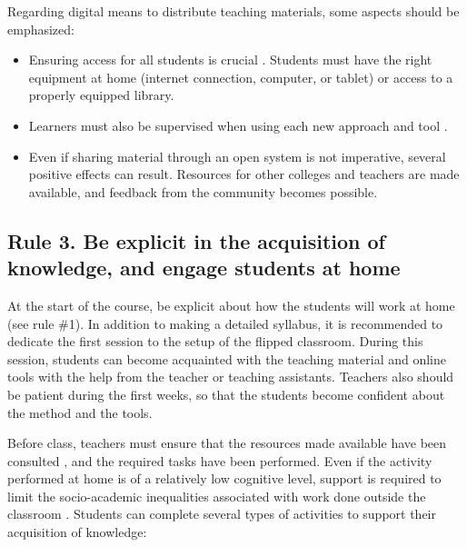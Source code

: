 \documentclass[10pt,letterpaper]{article}
\begin{document}
Regarding digital means to distribute teaching materials, some aspects should be emphasized:

\begin{itemize}

\item Ensuring access for all students is crucial \cite{lo_critical_2017}. 
Students must have the right equipment at home (internet connection, computer, or tablet) 
or access to a properly equipped library.

\item Learners must also be supervised when using each new approach and tool \cite{lo_critical_2017}.

\item Even if sharing material through an open system is not imperative, several positive effects can result. 
Resources for other colleges and teachers are made available, and feedback from the community becomes possible.

\end{itemize}

\subsection{Rule 3. Be explicit in the acquisition of knowledge, and engage students at home}

At the start of the course, be explicit about how the students will
work at home (see rule \#1). In addition to making a detailed syllabus, it is
recommended to dedicate the first session to the setup of the
flipped classroom. During this session, students can become acquainted with the teaching material
and online tools with the help from the teacher or teaching assistants.
Teachers also should be patient during the first weeks, so that the
students become confident about the method and the tools.

Before class, teachers must ensure that the resources made available
have been consulted \cite{lo_critical_2017}, and the required tasks have been performed. 
Even if the activity performed at home is of a relatively low cognitive level, 
support is required to limit the socio-academic inequalities associated 
with work done outside the classroom \cite{rayou_faire_2010}. 
Students can complete several types of activities to support their acquisition of knowledge:
\end{document}
